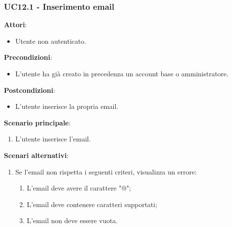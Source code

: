 \subsubsection{UC12.1 - Inserimento email} \label{usecase:12_1}
\textbf{Attori}:
\begin{itemize}
    \item Utente non autenticato.
\end{itemize}
\textbf{Precondizioni}:
\begin{itemize}
    \item L'utente ha già creato in precedenza un account base o amministratore.
\end{itemize}
\textbf{Postcondizioni}:
\begin{itemize}
    \item L'utente inserisce la propria email.
\end{itemize}
\textbf{Scenario principale}:
\begin{enumerate}
    \item L'utente inserisce l'email.
\end{enumerate}
\textbf{Scenari alternativi}:
\begin{enumerate}
    \item Se l'email non rispetta i seguenti criteri, visualizza un errore:
    \begin{enumerate}
        \item L'email deve avere il carattere "@";
        \item L'email deve contenere caratteri supportati;
        \item L'email non deve essere vuota.
    \end{enumerate}
\end{enumerate}